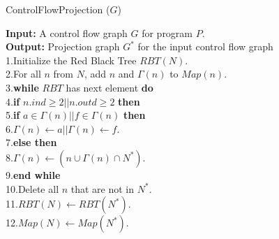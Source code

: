\begin{algorithm}
\caption{ControlFlowProjection ($G$)}\label{alg:A1}
\textbf{Input:} A control flow graph $G$ for program $P$.\\
\textbf{Output:} Projection graph $G^*$ for the input control flow graph\\
1.\quad	Initialize the Red Black Tree $\mathit{RBT}(N)$.\\
2.\quad	For all $n$ from $N$, add $n$ and $\Gamma(n)$ to $\mathit{Map}(n)$.\\
3.\quad	\textbf{while} $\mathit{RBT}$ has next element \textbf{do}\\
4.\quad	\quad \textbf{if} $n.ind\geq 2 || n.outd\geq 2$ \textbf{then}\\
5.\quad \quad \quad    \textbf{if} $a\in \Gamma(n) || f\in \Gamma(n)$ \textbf{then}\\
6.\quad \quad \quad \quad	   $\Gamma(n)\leftarrow a || \Gamma(n)\leftarrow f$.\\
7.\quad \quad \textbf{else then} \\
8.\quad \quad \quad  $\Gamma(n)\leftarrow (n\cup \Gamma(n)\cap N^*)$.\\
9.\quad\textbf{end while}\\
10.\quad	Delete all $n$ that are not in $N^*$.\\
11.\quad	$\mathit{RBT(N)} \leftarrow \mathit{RBT}(N^*)$.\\
12.\quad	$\mathit{Map}(N) \leftarrow \mathit{Map}(N^*)$.\\
\end{algorithm}


